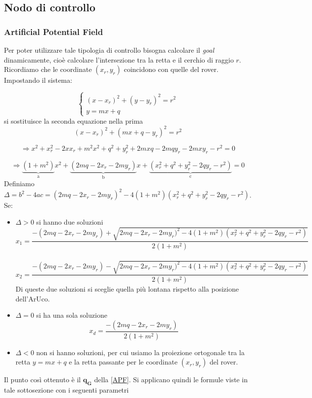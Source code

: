 \subsection{Nodo di controllo}

\subsubsection{Artificial Potential Field}
Per poter utilizzare tale tipologia di controllo bisogna calcolare il \textit{goal} dinamicamente, cioè calcolare l'intersezione tra la retta e il cerchio di raggio $r$. Ricordiamo che le coordinate $(x_r,y_r)$ coincidono con quelle del rover. Impostando il sistema:

\begin{equation} 
\begin{cases}

    (x-x_r)^2+(y-y_r)^2=r^2
   \\
    y=mx+q 
  \end{cases} 
\end{equation}
si sostituisce la seconda equazione nella prima
\begin{equation*}
(x-x_r)^2+(mx+q-y_r)^2=r^2
\end{equation*}

\begin{equation}
\Rightarrow x^2+x_r^2-2xx_r+m^2x^2+q^2+y_r^2+2mxq-2mqy_r-2mxy_r-r^2=0
\end{equation}

\begin{equation*}
\Rightarrow \underbrace{(1+m^2)}_\text{a}x^2+\underbrace{(2mq-2x_r-2my_r)}_\text{b}x+\underbrace{(x_r^2+q^2+y_r^2-2qy_r-r^2)}_\text{c}=0
\end{equation*}
Definiamo $\Delta=b^2-4ac=(2mq-2x_r-2my_r)^2-4(1+m^2)(x_r^2+q^2+y_r^2-2qy_r-r^2)$. \\Se:
\begin{itemize}
    \item $\Delta>0$ si hanno due soluzioni
        \begin{equation}
        x_1=\frac{-(2mq-2x_r-2my_r)+\sqrt{2mq-2x_r-2my_r)^2-4(1+m^2)(x_r^2+q^2+y_r^2-2qy_r-r^2)}}{2(1+m^2)}
        \end{equation}
        \\
        \begin{equation}
        x_2=\frac{-(2mq-2x_r-2my_r)-\sqrt{2mq-2x_r-2my_r)^2-4(1+m^2)(x_r^2+q^2+y_r^2-2qy_r-r^2)}}{2(1+m^2)}
        \end{equation}
        Di queste due soluzioni si sceglie quella più lontana rispetto alla posizione dell'ArUco.
    \item $\Delta=0$ si ha una sola soluzione
    \begin{equation}
        x_d=\frac{-(2mq-2x_r-2my_r)}{2(1+m^2)}
        \end{equation}
    \item $\Delta<0$ non si hanno soluzioni, per cui usiamo la proiezione ortogonale tra la retta $y=mx+q$ e la retta passante per le coordinate $(x_r, y_r)$ del rover.
\end{itemize}
Il punto così ottenuto è il $\boldsymbol{q_G}$ della \autoref{APF}.
Si applicano quindi le formule viste in tale sottosezione con i seguenti parametri

